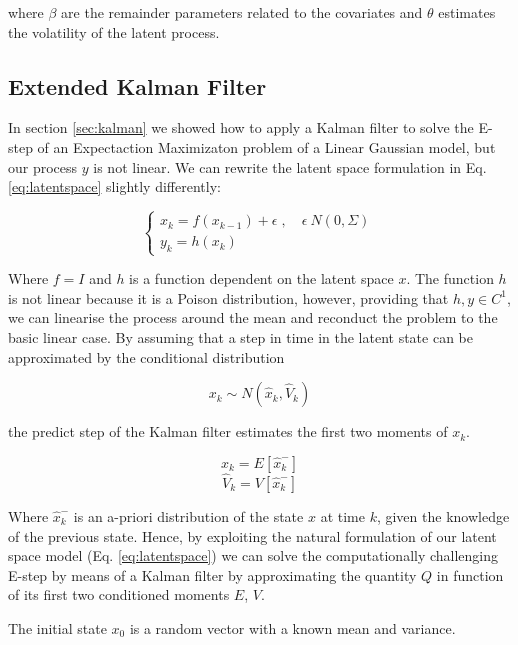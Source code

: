 \documentclass[mscthesis]{usiinfthesis}
\begin{document}
\noindent where $\beta$ are the remainder parameters related to the covariates and $\theta$ estimates the volatility of the latent process.


\subsection{Extended Kalman Filter}

In section \ref{sec:kalman} we showed how to apply a Kalman filter to solve the E-step of an Expectaction Maximizaton problem of a Linear Gaussian model, but our process $y$ is not linear. We can rewrite the latent space formulation in Eq. \ref{eq:latentspace} slightly differently:

\begin{eqfloat}
\begin{equation}
    \begin{cases}
      x_k = f(x_{k-1}) + \epsilon \; , \quad \epsilon ~ N(0, \Sigma) \\
      y_k = h(x_k) 
    \end{cases}\,
\label{eq:latentspace2}
\end{equation}
\end{eqfloat}

\noindent Where $f = I$ and $h$ is a function dependent on the latent space $x$. The function $h$ is not linear because it is a Poison distribution, however, providing that $h, y \in C^1$, we can linearise the process around the mean and reconduct the problem to the basic linear case. By assuming that a step in time in the latent state can be approximated by the conditional distribution 

\[
x_{k} \sim N( \hat{x}_k, \hat{V}_k)
\]

\noindent the predict step of the Kalman filter estimates the first two moments of $x_k$. 

\[
\hat{x}_k = E[\hat{x}^-_k]
\]
\[
\hat{V}_k = V[\hat{x}^-_k]
\]

Where $\hat{x}^-_k$  is an a-priori distribution of the state $x$ at time $k$, given the knowledge of the previous state. Hence, by exploiting the natural formulation of our latent space model (Eq. \ref{eq:latentspace}) we can solve the computationally challenging E-step by means of a Kalman filter by approximating the quantity $Q$ in function of its first two conditioned moments $E$, $V$. 

\noindent The initial state $x_0$ is a random vector with a known mean and variance.
\end{document}
